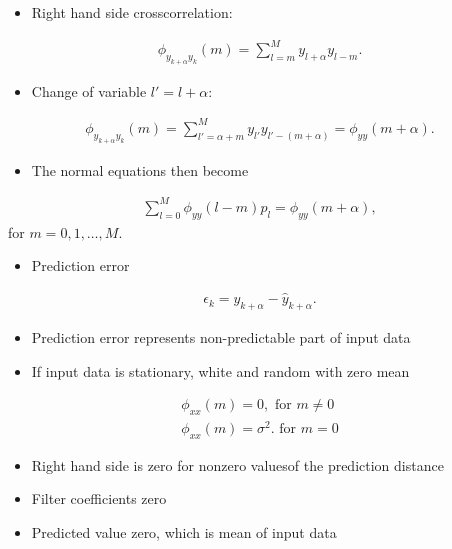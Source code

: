 \documentclass[xcolor=dvipsnames,notes]{beamer}
\begin{document}
%
\begin{frame}
 \begin{itemize}
  \item Right hand side crosscorrelation:
 \end{itemize}
%
\begin{eqnarray}
  \phi_{y_{k+\alpha}y_k}(m) = \sum^{M}_{l=m} y_{l+\alpha} y_{l-m}.
\end{eqnarray}
%
\begin{itemize}
\item Change of variable $l'=l+\alpha$:
\end{itemize}
%
\begin{eqnarray}
 \phi_{y_{k+\alpha}y_k}(m)  = 
       \sum^{M}_{l'=\alpha+m} y_{l'} y_{l'-(m+\alpha)} = \phi_{yy}(m+\alpha).
\end{eqnarray}
%
\begin{itemize}
\item The normal equations then become
\end{itemize}
%
\begin{eqnarray}
  \sum^M_{l=0} \phi_{yy}(l-m)p_l = \phi_{yy}(m+\alpha), 
                           \label{eq:prednorm}
\end{eqnarray}
%
for $m=0,1,\ldots,M$. 
\end{frame}
%
\begin{frame}
\sf
\begin{itemize}
\item Prediction error
\end{itemize}
%
\begin{eqnarray}
 \epsilon_k = y_{k+\alpha}-\hat{y}_{k+\alpha}.
                 \label{eq:prederr}
\end{eqnarray}
%
\begin{itemize}
\item Prediction error represents  non-predictable part of input data
\item If input data is stationary, white and random with zero mean 
\end{itemize}
% 
\begin{eqnarray}
  \phi_{xx}(m) = 0, \,\, \mbox{for}\,\, m \ne 0\nonumber\\
  \phi_{xx}(m) = \sigma^2. \,\, \mbox{for}\,\, m = 0
\end{eqnarray}
%
\begin{itemize}
 \item Right hand side is zero for nonzero valuesof the prediction distance 
\item Filter coefficients  zero 
\item Predicted value zero, which is mean of input data
\end{itemize}
\end{frame}
\end{document}
